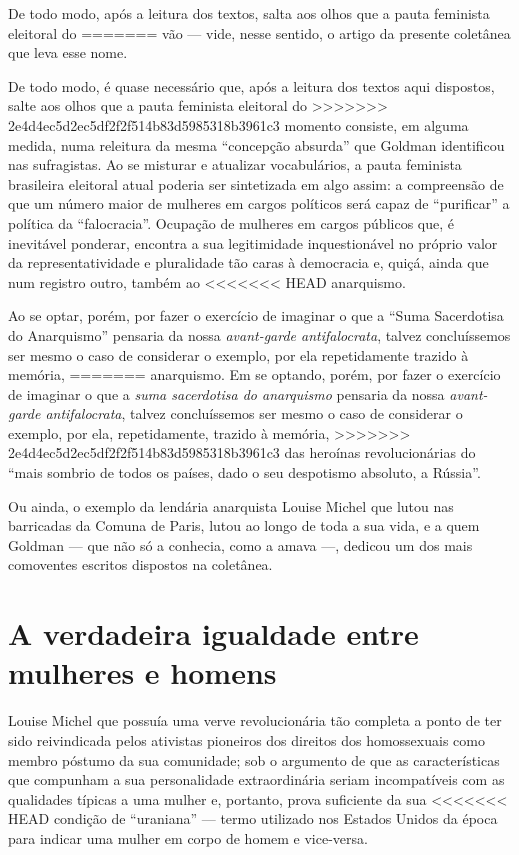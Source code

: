 De todo modo, após a leitura dos textos,
salta aos olhos que a pauta feminista eleitoral do
=======
vão --- vide, nesse sentido, o artigo da presente coletânea que leva esse
nome. 

De todo modo, é quase necessário que, após a leitura dos textos
aqui dispostos, salte aos olhos que a pauta feminista eleitoral do
>>>>>>> 2e4d4ec5d2ec5df2f2f514b83d5985318b3961c3
momento consiste, em alguma medida, numa releitura da mesma ``concepção
absurda'' que Goldman identificou nas sufragistas. Ao se misturar e
atualizar vocabulários, a pauta feminista brasileira eleitoral atual poderia ser sintetizada em algo assim: a compreensão de
que um número maior de mulheres em cargos políticos será capaz de
``purificar'' a política da ``falocracia''. Ocupação de mulheres em
cargos públicos que, é inevitável ponderar, encontra a sua legitimidade
inquestionável no próprio valor da representatividade e pluralidade tão
caras à democracia e, quiçá, ainda que num registro outro, também ao
<<<<<<< HEAD
anarquismo.

Ao se optar, porém, por fazer o exercício de imaginar o
que a ``Suma Sacerdotisa do Anarquismo'' pensaria da nossa
\emph{avant-garde antifalocrata}, talvez concluíssemos ser mesmo o
caso de considerar o exemplo, por ela repetidamente trazido à memória,
=======
anarquismo. Em se optando, porém, por fazer o exercício de imaginar o
que a \textit{suma sacerdotisa do anarquismo} pensaria da nossa
\textit{avant-garde antifalocrata}, talvez concluíssemos ser mesmo o
caso de considerar o exemplo, por ela, repetidamente, trazido à memória,
>>>>>>> 2e4d4ec5d2ec5df2f2f514b83d5985318b3961c3
das heroínas revolucionárias do ``mais sombrio de todos os países, dado
o seu despotismo absoluto, a Rússia''. 

Ou ainda, o exemplo da lendária
anarquista Louise Michel que lutou nas barricadas da Comuna de Paris,
lutou ao longo de toda a sua vida, e a quem Goldman --- que não só a
conhecia, como a amava ---, dedicou um dos mais comoventes escritos
dispostos na coletânea.

\section{A verdadeira igualdade entre mulheres e homens}

Louise Michel que possuía uma verve
revolucionária tão completa a ponto de ter sido reivindicada pelos
ativistas pioneiros dos direitos dos homossexuais como membro póstumo da
sua comunidade; sob o argumento de que as características que compunham
a sua personalidade extraordinária seriam incompatíveis com as
qualidades típicas a uma mulher e, portanto, prova suficiente da sua
<<<<<<< HEAD
condição de ``uraniana'' --- termo utilizado nos Estados Unidos da época
para indicar uma mulher em corpo de homem e vice-versa.

